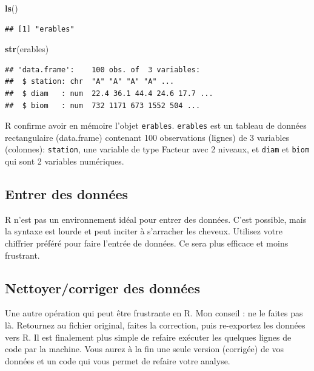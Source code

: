 \documentclass[12pt,]{book}
\newenvironment{Shaded}{\begin{snugshade}}{\end{snugshade}}
\newcommand{\KeywordTok}[1]{\textcolor[rgb]{0.27,0.27,0.27}{\textbf{#1}}}
\newcommand{\NormalTok}[1]{#1}
\begin{document}
\begin{Shaded}
\begin{Highlighting}[]
\KeywordTok{ls}\NormalTok{()}
\end{Highlighting}
\end{Shaded}

\begin{verbatim}
## [1] "erables"
\end{verbatim}

\begin{Shaded}
\begin{Highlighting}[]
\KeywordTok{str}\NormalTok{(erables)}
\end{Highlighting}
\end{Shaded}

\begin{verbatim}
## 'data.frame':	100 obs. of  3 variables:
##  $ station: chr  "A" "A" "A" "A" ...
##  $ diam   : num  22.4 36.1 44.4 24.6 17.7 ...
##  $ biom   : num  732 1171 673 1552 504 ...
\end{verbatim}

R confirme avoir en mémoire l'objet \texttt{erables}.
\texttt{erables} est un tableau de données rectangulaire (data.frame) contenant 100 observations (lignes) de 3 variables (colonnes): \texttt{station}, une variable de type Facteur avec 2 niveaux, et \texttt{diam} et \texttt{biom} qui sont 2 variables numériques.

\hypertarget{entrer-des-donnuxe9es}{%
\subsection{Entrer des données}\label{entrer-des-donnuxe9es}}

R n'est pas un environnement idéal pour entrer des données.
C'est possible, mais la syntaxe est lourde et peut inciter à s'arracher les cheveux.
Utilisez votre chiffrier préféré pour faire l'entrée de données.
Ce sera plus efficace et moins frustrant.

\hypertarget{nettoyercorriger-des-donnuxe9es}{%
\subsection{Nettoyer/corriger des données}\label{nettoyercorriger-des-donnuxe9es}}

Une autre opération qui peut être frustrante en R.
Mon conseil : ne le faites pas là.
Retournez au fichier original, faites la correction, puis re-exportez les données vers R.
Il est finalement plus simple de refaire exécuter les quelques lignes de code par la machine.
Vous aurez à la fin une seule version (corrigée) de vos données et un code qui vous permet de refaire votre analyse.
\end{document}
